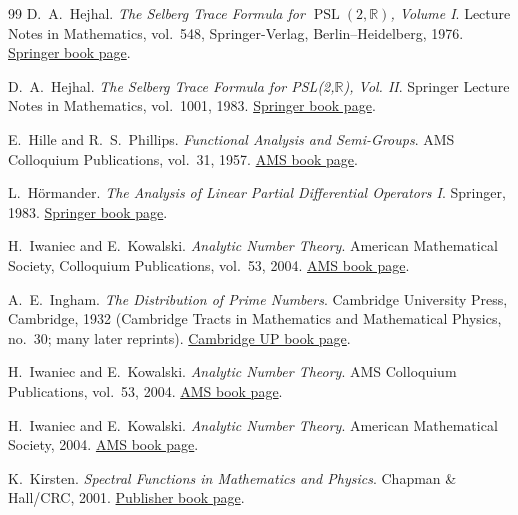 \documentclass{article}
\numberwithin{equation}{section}
\theoremstyle{plain}
\theoremstyle{definition}
\theoremstyle{remark}
\begin{document}
\begin{thebibliography}{99}
D.~A.~Hejhal.
\newblock \emph{The Selberg Trace Formula for $\operatorname{PSL}(2,\mathbb{R})$, Volume I}.
\newblock Lecture Notes in Mathematics, vol.~548, Springer-Verlag, Berlin--Heidelberg, 1976.
\newblock \href{https://link.springer.com/book/10.1007/BFb0079608}{Springer book page}.



D.~A.~Hejhal.
\newblock \emph{The Selberg Trace Formula for PSL(2,$\mathbb{R}$), Vol. II}.
\newblock Springer Lecture Notes in Mathematics, vol.~1001, 1983.
\newblock \href{https://link.springer.com/book/10.1007/BFb0068497}{Springer book page}.

E.~Hille and R.~S.~Phillips.
\newblock \emph{Functional Analysis and Semi-Groups}.
\newblock AMS Colloquium Publications, vol.~31, 1957.
\newblock \href{https://bookstore.ams.org/coll-31}{AMS book page}.

L.~H\"ormander.
\newblock \emph{The Analysis of Linear Partial Differential Operators I}.
\newblock Springer, 1983.
\newblock \href{https://link.springer.com/book/10.1007/978-3-642-61497-5}{Springer book page}.

H.~Iwaniec and E.~Kowalski.
\newblock \emph{Analytic Number Theory}.
\newblock American Mathematical Society, Colloquium Publications, vol.~53, 2004.
\newblock \href{https://bookstore.ams.org/coll-53/}{AMS book page}.

A.~E.~Ingham.
\newblock \emph{The Distribution of Prime Numbers}.
\newblock Cambridge University Press, Cambridge, 1932 (Cambridge Tracts in Mathematics and Mathematical Physics, no.~30; many later reprints).
\newblock \href{https://www.cambridge.org/us/universitypress/subjects/mathematics/number-theory/distribution-prime-numbers?format=PB&isbn=9780521397896}{Cambridge UP book page}.


H.~Iwaniec and E.~Kowalski.
\newblock \emph{Analytic Number Theory}.
\newblock AMS Colloquium Publications, vol.~53, 2004.
\newblock \href{https://bookstore.ams.org/coll-53/}{AMS book page}.

H.~Iwaniec and E.~Kowalski.
\newblock \emph{Analytic Number Theory}.
\newblock American Mathematical Society, 2004.
\newblock \href{https://bookstore.ams.org/coll-53/}{AMS book page}.

K.~Kirsten.
\newblock \emph{Spectral Functions in Mathematics and Physics}.
\newblock Chapman \& Hall/CRC, 2001.
\newblock \href{https://www.routledge.com/Spectral-Functions-in-Mathematics-and-Physics/Kirsten/p/book/9780367455064}{Publisher book page}.



\end{thebibliography}
\end{document}
